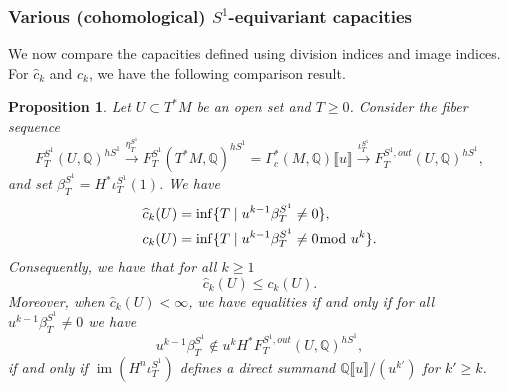 \documentclass[11pt]{amsart}
\numberwithin{equation}{section}
\theoremstyle{plain}
\newtheorem{Prop}[prop]{Proposition}
\theoremstyle{definition}
\theoremstyle{remark}
\newcommand{\bQ} { {\mathbb{Q}}}
\newcommand{\fpw}[1]{{\llbracket #1\rrbracket}}
\newcommand\im{ {\operatorname{im}} }
\begin{document}
\subsubsection{\texorpdfstring{Various (cohomological) $S^1$-equivariant capacities}{}}
We now compare the capacities defined using division indices and image indices. For $\widehat{c}_k$ and $ {c}_k$, we have the following comparison result.
\begin{Prop}\label{prop: c=hat c, direct summand criterion}Let $U\subset T^*M$ be an open set and $T\geq 0$. Consider the fiber sequence
\[ F^{S^1}_{T}(U,\bQ)^{hS^1}\xrightarrow{\eta_T^{S^1}}   F^{S^1}_{T}(T^*M,\bQ)^{hS^1}=\Gamma_c^{*}(M,\bQ)\fpw{u}\xrightarrow{\iota_T^{S^1}} F^{S^1,out}_{T}(U,\bQ)^{hS^1},\]
and
set $\beta_T^{S^1}=H^*\iota_T^{S^1}(1)$. We have
\begin{align*}
    \widehat{c}_k(U)&=\inf\{T\mid u^{k-1}\beta_T^{S^1}\neq 0\},\\
    c_k(U)&=\inf\{T\mid u^{k-1}\beta_T^{S^1}\neq 0\hspace{-6pt} \mod u^k\}.
\end{align*}
Consequently, we have that for all $k\geq 1$ 
\[\widehat{c}_k(U)\leq {c}_k(U).\]
Moreover, when $\widehat{c}_k(U)<\infty$, we have equalities if and only if
for all $u^{k-1}\beta_T^{S^1} \neq 0$ we have
\[u^{k-1}\beta_T^{S^1} \notin u^kH^*F^{S^1,out}_{T}(U,\bQ)^{hS^1},\]
if and only if $\im(H^{n}\iota_T^{S^1})$ defines a direct summand $\bQ\fpw{u}/(u^{k'})$ for $k' \geq k$.

\end{Prop}
\end{document}
